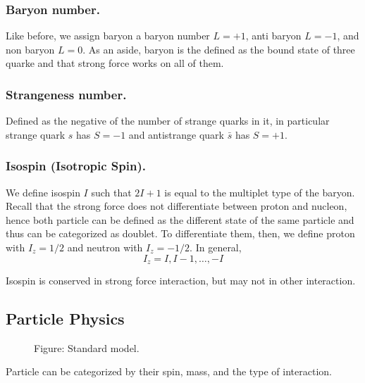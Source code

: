 \documentclass[../../../main.tex]{subfiles}
\begin{document}
\subsubsection*{Baryon number.} Like before, we assign baryon a baryon number $L=+1$, anti baryon $L=-1$, and non baryon $L=0$. As an aside, baryon is the defined as the bound state of three quarke and that strong force works on all of them.

\subsubsection*{Strangeness number.} Defined as the negative of the number of strange quarks in it, in particular strange quark $s$ has $S=-1$ and antistrange quark $\bar{s}$ has $S=+1$.

\subsubsection*{Isospin (Isotropic Spin).} We define isospin $I$ such that $2I+1$ is equal to the multiplet type of the baryon. Recall that the strong force does not differentiate between proton and nucleon, hence both particle can be defined as the different state of the same particle and thus can be categorized as doublet. To differentiate them, then, we define proton with $I_z=1/2$ and neutron with $I_z=-1/2$. In general,
\begin{equation*}
    I_z=I,I-1,\dots,-I
\end{equation*}

Isospin is conserved in strong force interaction, but may not in other interaction.

\subsection*{Particle Physics}
\begin{figure*}
    \centering
    \caption*{Figure: Standard model.}
\end{figure*}
Particle can be categorized by their spin, mass, and the type of interaction.
\end{document}
